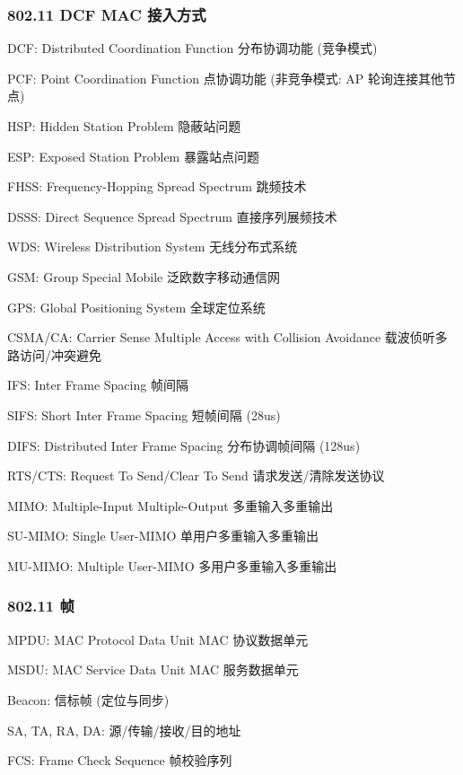 \documentclass[UTF8,cs4size]{ctexart}
\begin{document}
\subsubsection{802.11 DCF MAC 接入方式}
\begin{compactitem}
  \item DCF: Distributed Coordination Function 分布协调功能 (竞争模式)
  \item PCF: Point Coordination Function 点协调功能 (非竞争模式: AP 轮询连接其他节点)
  \item HSP: Hidden Station Problem 隐蔽站问题
  \item ESP: Exposed Station Problem 暴露站点问题
  \item FHSS: Frequency-Hopping Spread Spectrum 跳频技术
  \item DSSS: Direct Sequence Spread Spectrum 直接序列展频技术
  \item WDS: Wireless Distribution System 无线分布式系统
  \item GSM: Group Special Mobile 泛欧数字移动通信网
  \item GPS: Global Positioning System 全球定位系统
  \item CSMA/CA: Carrier Sense Multiple Access with Collision Avoidance 载波侦听多路访问/冲突避免
  \item IFS: Inter Frame Spacing 帧间隔
  \item SIFS: Short Inter Frame Spacing 短帧间隔 (28us)
  \item DIFS: Distributed Inter Frame Spacing 分布协调帧间隔 (128us)
  \item RTS/CTS: Request To Send/Clear To Send 请求发送/清除发送协议
  \item MIMO: Multiple-Input Multiple-Output 多重输入多重输出
  \item SU-MIMO: Single User-MIMO 单用户多重输入多重输出
  \item MU-MIMO: Multiple User-MIMO 多用户多重输入多重输出
\end{compactitem}
\subsubsection{802.11 帧}
\begin{compactitem}
  \item MPDU: MAC Protocol Data Unit MAC 协议数据单元
  \item MSDU: MAC Service Data Unit MAC 服务数据单元 
  \item Beacon: 信标帧 (定位与同步)
  \item SA, TA, RA, DA: 源/传输/接收/目的地址
  \item FCS: Frame Check Sequence 帧校验序列
\end{compactitem}
\end{document}
